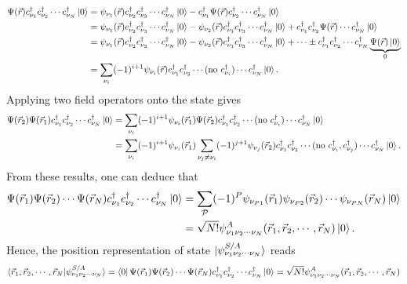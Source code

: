 \documentclass[a4paper,12pts]{article}
\numberwithin{equation}{section}
\begin{document}
	\begin{align}
	\Psi(\vec{r})c^{\dagger}_{\nu_1}c^{\dagger}_{\nu_2}\cdots c^{\dagger}_{\nu_N}\ket{0} &= \psi_{\nu_1}(\vec{r})c^{\dagger}_{\nu_2}c^{\dagger}_{\nu_3}\cdots c^{\dagger}_{\nu_N}\ket{0} - c^{\dagger}_{\nu_1}\Psi(\vec{r})c^{\dagger}_{\nu_2}\cdots c^{\dagger}_{\nu_N}\ket{0}\\
	&= \psi_{\nu_1}(\vec{r})c^{\dagger}_{\nu_2}c^{\dagger}_{\nu_3}\cdots c^{\dagger}_{\nu_N}\ket{0} - \psi_{\nu_2}(\vec{r})c^{\dagger}_{\nu_1}c^{\dagger}_{\nu_3}\cdots c^{\dagger}_{\nu_N}\ket{0} + c^{\dagger}_{\nu_1}c^{\dagger}_{\nu_2}\Psi(\vec{r})\cdots c^{\dagger}_{\nu_N}\ket{0}\\
	&= \psi_{\nu_1}(\vec{r})c^{\dagger}_{\nu_2}c^{\dagger}_{\nu_3}\cdots c^{\dagger}_{\nu_N}\ket{0} - \psi_{\nu_2}(\vec{r})c^{\dagger}_{\nu_1}c^{\dagger}_{\nu_3}\cdots c^{\dagger}_{\nu_N}\ket{0} +\cdots \pm c^{\dagger}_{\nu_1}c^{\dagger}_{\nu_2}\cdots c^{\dagger}_{\nu_N}\underbrace{\Psi(\vec{r})\ket{0}}_{0}\\
	&= \sum_{\nu_i}(-1)^{i+1}\psi_{\nu_i}(\vec{r})c^{\dagger}_{\nu_1}c^{\dagger}_{\nu_2}\cdots(\text{no }c^{\dagger}_{\nu_i})\cdots c^{\dagger}_{\nu_N}\ket{0}.
	\end{align}
	Applying two field operators onto the state gives
	\begin{align}
	\Psi(\vec{r}_2)\Psi(\vec{r}_1)c^{\dagger}_{\nu_1}c^{\dagger}_{\nu_2}\cdots c^{\dagger}_{\nu_N}\ket{0} &= \sum_{\nu_i}(-1)^{i+1}\psi_{\nu_i}(\vec{r}_1)\Psi(\vec{r}_2)c^{\dagger}_{\nu_1}c^{\dagger}_{\nu_2}\cdots(\text{no }c^{\dagger}_{\nu_i})\cdots c^{\dagger}_{\nu_N}\ket{0}\\
	&= \sum_{\nu_i}(-1)^{i+1}\psi_{\nu_i}(\vec{r}_1)\sum_{\nu_j\neq\nu_i}(-1)^{j+1}\psi_{\nu_j}(\vec{r}_2)c^{\dagger}_{\nu_1}c^{\dagger}_{\nu_2}\cdots(\text{no }c^{\dagger}_{\nu_i},c^{\dagger}_{\nu_j})\cdots c^{\dagger}_{\nu_N}\ket{0}.
	\end{align}
	From these results, one can deduce that
	\begin{align}
	\Psi(\vec{r}_1)\Psi(\vec{r}_2)\cdots\Psi(\vec{r}_N)c^{\dagger}_{\nu_1}c^{\dagger}_{\nu_2}\cdots c^{\dagger}_{\nu_N}\ket{0} &= \sum_{\mathcal{P}}(-1)^P\psi_{\nu_{P1}}(\vec{r}_1)\psi_{\nu_{P2}}(\vec{r}_2)\cdots\psi_{\nu_{PN}}(\vec{r}_N)\ket{0} \\
	&= \sqrt{N!}\psi^A_{\nu_1\nu_2\cdots\nu_N}(\vec{r}_1,\vec{r}_2,\cdots,\vec{r}_N)\ket{0}.
	\end{align}
	Hence, the position representation of state $\ket{\psi_{\nu_1\nu_2\cdots\nu_N}^{S/A}}$ reads
	\begin{align}
	\braket{\vec{r}_1,\vec{r}_2,\cdots,\vec{r}_N|\psi_{\nu_1\nu_2\cdots\nu_N}^{S/A}} = \bra{0}\Psi(\vec{r}_1)\Psi(\vec{r}_2)\cdots\Psi(\vec{r}_N)c^{\dagger}_{\nu_1}c^{\dagger}_{\nu_2}\cdots c^{\dagger}_{\nu_N}\ket{0} = \sqrt{N!}\psi^A_{\nu_1\nu_2\cdots\nu_N}(\vec{r}_1,\vec{r}_2,\cdots,\vec{r}_N)
	\end{align}
\end{document}
